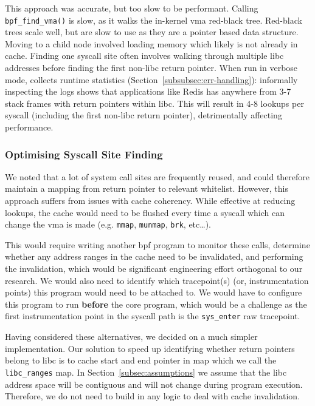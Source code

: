 This approach was accurate, but too slow to be performant. Calling \texttt{bpf\_find\_vma()} is
slow, as it walks the in-kernel \ac{vma} red-black tree. Red-black trees scale
well, but are slow to use as they are a pointer based data structure. Moving to
a child node involved loading memory which likely is not already in cache.
Finding one syscall site often involves walking through multiple \ac{libc}
addresses before finding the first non-\ac{libc} return pointer. When run in
verbose mode, \af collects runtime statistics
(Section~\ref{subsubsec:err-handling}): informally inspecting the logs shows that
applications like Redis has anywhere from 3-7 stack frames with return pointers 
within \ac{libc}. This will result in 4-8 lookups per syscall (including the
first non-\ac{libc} return pointer), detrimentally affecting performance.

\subsubsection{Optimising Syscall Site
Finding}\label{subsubsec:impl-find-site-opt}

We noted that a lot of system call sites are frequently reused, and could
therefore maintain a mapping from return pointer to relevant whitelist. However,
this approach suffers from issues with cache coherency. While effective at
reducing lookups, the cache would need to be flushed every time a syscall which
can change the \ac{vma} is made (e.g. \texttt{mmap}, \texttt{munmap},
\texttt{brk}, etc\dots). 

This would require writing another \ac{bpf} program to
monitor these calls, determine whether any address ranges in the cache need to
be invalidated, and performing the invalidation, which would be significant
engineering effort orthogonal to our research. We would also need to identify
which tracepoint(s) (or, instrumentation points) this program would need to be
attached to. We would have to configure this program to run \textbf{before} the
\af core program, which would be a challenge as the first instrumentation point
in the syscall path is the \texttt{sys\_enter} raw tracepoint.

Having considered these alternatives, we decided on a much simpler
implementation. Our solution to speed up identifying whether return pointers
belong to \ac{libc} is to cache  start and end pointer in 
map which we call the \texttt{libc\_ranges} map. In 
Section~\ref{subsec:assumptions} we assume that the  \ac{libc} address space 
will be contiguous and will not change during program execution. Therefore, we
do not need to build in any logic to deal with cache invalidation.

